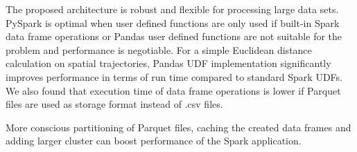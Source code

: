 The proposed architecture is robust and flexible for processing large data sets. PySpark is optimal when user defined functions are only used if built-in Spark data frame operations or Pandas user defined functions are not suitable for the problem and performance is negotiable. For a simple Euclidean distance calculation on spatial trajectories, Pandas UDF implementation significantly improves performance in terms of run time compared to standard Spark UDFs. We also found that execution time of data frame operations is lower if Parquet files are used as storage format instead of .csv files.

More conscious partitioning of Parquet files, caching the created data frames and adding larger cluster can boost performance of the Spark application.

